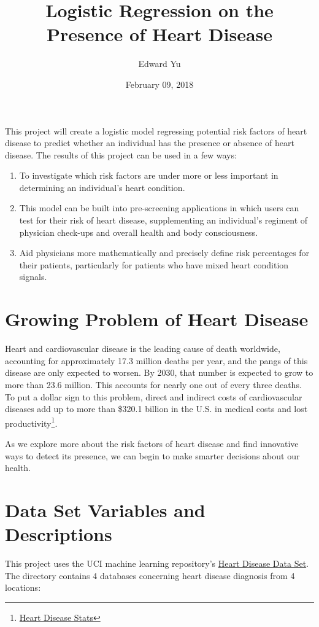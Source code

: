 \documentclass[12pt]{article}
\title{Logistic Regression on the Presence of Heart Disease}
\author{Edward Yu}
\date{February 09, 2018}
\begin{document}
\maketitle
\tableofcontents

\abstract
This project will create a logistic model regressing potential risk factors of heart disease to predict whether an individual has the presence or absence of heart disease. The results of this project can be used in a few ways: 

\begin{enumerate}
  \item To investigate which risk factors are under more or less important in determining an individual's heart condition. 
  \item This model can be built into pre-screening applications in which users can test for their risk of heart disease, supplementing an individual's regiment of physician check-ups and overall  health and body consciousness.
  \item Aid physicians more mathematically and precisely define risk percentages for their patients, particularly for patients who have mixed heart condition signals. 
  \end{enumerate}
\pagebreak
\section{Growing Problem of Heart Disease}
Heart and cardiovascular disease is the leading cause of death worldwide, accounting for approximately 17.3 million deaths per year, and the pangs of this disease are only expected to worsen. By 2030, that number is expected to grow to more than 23.6 million. This accounts for nearly one out of every three deaths. To put a dollar sign to this problem, direct and indirect costs of cardiovascular diseases add up to more than \$320.1 billion in the U.S. in medical costs and lost productivity\footnote{\href{https://healthmetrics.heart.org/wp-content/uploads/2017/06/Heart-Disease-and-Stroke-Statistics-2017-ucm_491265.pdf}{Heart Disease Stats}}.

  As we explore more about the risk factors of heart disease and find innovative ways to detect its presence, we can begin to make smarter decisions about our health. 

\section{Data Set Variables and Descriptions}
This project uses the UCI machine learning repository's \href{http://archive.ics.uci.edu/ml/datasets/Heart+Disease}{Heart Disease Data Set}. The directory contains 4 databases concerning heart disease diagnosis from 4 locations: 
\end{document}
